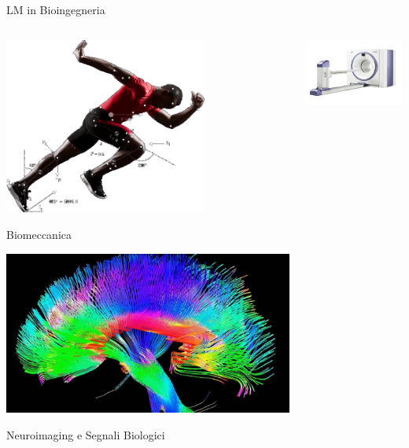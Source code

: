 \documentclass{beamer}
\begin{document}
	\begin{frame}{LM in Bioingegneria}
		\begin{columns}
			\begin{column}{0.4\textwidth}
				\centering
				\includegraphics[width=0.7\textwidth]{Biomeccanica.png}

				Biomeccanica

				\vspace{0.5cm}
				\includegraphics[width=\textwidth]{neuroimaging.jpeg}

				Neuroimaging e Segnali Biologici
			\end{column}
			\begin{column}{0.4\textwidth}
				\centering
				\includegraphics[width=\textwidth]{petmachine.png}


\end{column}
\end{columns}
\end{frame}
\end{document}
